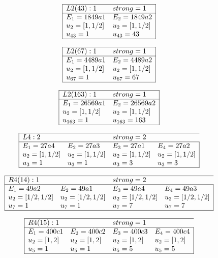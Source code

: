 \documentclass[11pt]{article}
\theoremstyle{definition}
\begin{document}
$$
 \begin{array}{|ll|} 
\hline 
  L2(43):1  & strong=1\\
\hline
 E_1=1849a1 & E_2=1849a2 \\
  u_{2}=[ 1, 1/2 ]&  u_{2}=[ 1, 1/2 ]\\
  u_{43}=1&  u_{43}=43\\
\hline
\end{array}
 $$


$$
 \begin{array}{|ll|} 
\hline 
  L2(67):1  & strong=1\\
\hline
 E_1=4489a1 & E_2=4489a2 \\
  u_{2}=[ 1, 1/2 ]&  u_{2}=[ 1, 1/2 ]\\
  u_{67}=1&  u_{67}=67\\
\hline
\end{array}
 $$


$$
 \begin{array}{|ll|} 
\hline 
  L2(163):1  & strong=1\\
\hline
 E_1=26569a1 & E_2=26569a2 \\
  u_{2}=[ 1, 1/2 ]&  u_{2}=[ 1, 1/2 ]\\
  u_{163}=1&  u_{163}=163\\
\hline
\end{array}
 $$


$$
 \begin{array}{|llll|} 
\hline 
  L4:2  &   & strong=2\\
\hline
 E_1=27a4 & E_2=27a3 & E_3=27a1 & E_4=27a2 \\
  u_{2}=[ 1, 1/2 ]&  u_{2}=[ 1, 1/2 ]&  u_{2}=[ 1, 1/2 ]&  u_{2}=[ 1, 1/2 ]\\
  u_{3}=1&  u_{3}=1&  u_{3}=3&  u_{3}=3\\
\hline
\end{array}
 $$


$$
 \begin{array}{|llll|} 
\hline 
  R4(14):1  &   & strong=2\\
\hline
 E_1=49a2 & E_2=49a1 & E_3=49a4 & E_4=49a3 \\
  u_{2}=[ 1/2, 1/2 ]&  u_{2}=[ 1/2, 1/2 ]&  u_{2}=[ 1/2, 1/2 ]&  u_{2}=[ 1/2, 1/2 ]\\
  u_{7}=1&  u_{7}=1&  u_{7}=7&  u_{7}=7\\
\hline
\end{array}
 $$


$$
 \begin{array}{|llll|} 
\hline 
  R4(15):1  &   & strong=1\\
\hline
 E_1=400c1 & E_2=400c2 & E_3=400c3 & E_4=400c4 \\
  u_{2}=[ 1, 2 ]&  u_{2}=[ 1, 2 ]&  u_{2}=[ 1, 2 ]&  u_{2}=[ 1, 2 ]\\
  u_{5}=1&  u_{5}=1&  u_{5}=5&  u_{5}=5\\
\hline
\end{array}
 $$
\end{document}
